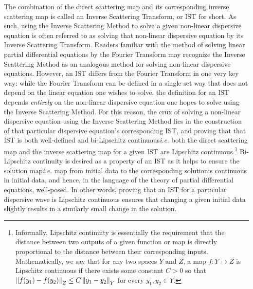 \documentclass[../dissertation.tex]{subfiles}
\begin{document}
The combination of the direct scattering map and its corresponding inverse 
scattering map is called an 
Inverse Scattering Transform, or IST for short. As such, using the Inverse 
Scattering Method to solve a given non-linear dispersive equation is often 
referred to as solving that non-linear dispersive equation by its Inverse 
Scattering Transform. Readers familiar with the method of solving linear partial 
dif{}ferential equations by the Fourier Transform may recognize the Inverse 
Scattering Method as an analogous method for solving non-linear dispersive 
equations. However, an IST dif{}fers from the Fourier Transform in one very 
key way: while the Fourier Transform can be defined in a single set way that 
does not depend on the linear equation one wishes to solve, the definition for 
an IST depends \textit{entirely} on the non-linear dispersive equation one hopes 
to solve using the Inverse Scattering Method. For this reason, the crux of 
solving a non-linear dispersive equation using the Inverse Scattering Method 
lies in the construction of that particular dispersive equation's 
corresponding IST, and proving that that IST is both well-defined and 
bi-Lipschitz continuous\textemdash{}\textit{i.e.} both the direct scattering map
and the inverse scattering map for a given IST are Lipschitz 
continuous.\footnote{Informally, Lipschitz continuity is essentially the requirement
that the distance between two outputs of a given function or map is directly 
proportional to the distance between their corresponding inputs. Mathematically,
we say that for any two spaces $Y$ and $Z$, a map $f : Y \to Z$ is Lipschitz 
continuous if there exists some constant $C>0$ so that 
$\left\| f(y_1) - f(y_2) \right\|_Z \leq C \left\| y_1 - y_2 \right\|_Y$ for every $y_1, y_2 \in Y$.}
Bi-Lipschitz continuity is desired as a property of an IST as it helps to ensure 
the solution map\textemdash{}\textit{i.e.} map from initial data to the 
corresponding solution\textemdash{}is continuous in initial data, and hence, 
in the language of the theory of partial differential equations, well-posed.
In other words, proving that an IST for a particular dispersive wave is 
Lipschitz continuous ensures that changing a given initial data slightly 
results in a similarly small change in the solution. 
\end{document}
